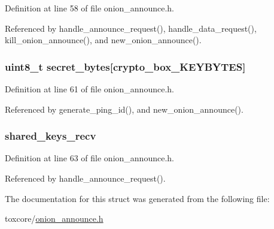 Definition at line 58 of file onion\+\_\+announce.\+h.



Referenced by handle\+\_\+announce\+\_\+request(), handle\+\_\+data\+\_\+request(), kill\+\_\+onion\+\_\+announce(), and new\+\_\+onion\+\_\+announce().

\hypertarget{struct_onion___announce_ad4bfea97df71f88d6de4cbf53f301928}{
\subsubsection[{secret\+\_\+bytes}]{\setlength{\rightskip}{0pt plus 5cm}uint8\+\_\+t secret\+\_\+bytes\mbox{[}{\bf crypto\+\_\+box\+\_\+\+K\+E\+Y\+B\+Y\+T\+E\+S}\mbox{]}}}\label{struct_onion___announce_ad4bfea97df71f88d6de4cbf53f301928}


Definition at line 61 of file onion\+\_\+announce.\+h.



Referenced by generate\+\_\+ping\+\_\+id(), and new\+\_\+onion\+\_\+announce().

\hypertarget{struct_onion___announce_a4c647e235c4b9d2d6d68d760c7cb1b30}{
\subsubsection[{shared\+\_\+keys\+\_\+recv}]{ shared\+\_\+keys\+\_\+recv}}\label{struct_onion___announce_a4c647e235c4b9d2d6d68d760c7cb1b30}


Definition at line 63 of file onion\+\_\+announce.\+h.



Referenced by handle\+\_\+announce\+\_\+request().



The documentation for this struct was generated from the following file\+:\begin{DoxyCompactItemize}
\item 
toxcore/\hyperlink{onion__announce_8h}{onion\+\_\+announce.\+h}\end{DoxyCompactItemize}
